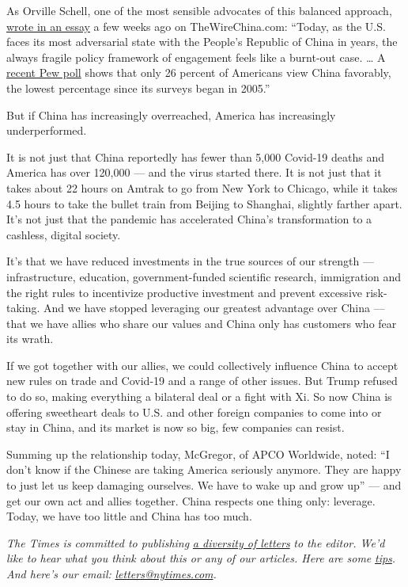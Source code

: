 As Orville Schell, one of the most sensible advocates of this balanced
approach,
\href{https://www.thewirechina.com/2020/06/07/the-birth-life-and-death-of-engagement/}{wrote
in an essay} a few weeks ago on TheWireChina.com: ``Today, as the U.S.
faces its most adversarial state with the People's Republic of China in
years, the always fragile policy framework of engagement feels like a
burnt-out case. \ldots{} A
\href{https://www.pewresearch.org/global/2020/04/21/u-s-views-of-china-increasingly-negative-amid-coronavirus-outbreak/}{recent
Pew poll} shows that only 26 percent of Americans view China favorably,
the lowest percentage since its surveys began in 2005.''

But if China has increasingly overreached, America has increasingly
underperformed.

It is not just that China reportedly has fewer than 5,000 Covid-19
deaths and America has over 120,000 --- and the virus started there. It
is not just that it takes about 22 hours on Amtrak to go from New York
to Chicago, while it takes 4.5 hours to take the bullet train from
Beijing to Shanghai, slightly farther apart. It's not just that the
pandemic has accelerated China's transformation to a cashless, digital
society.

It's that we have reduced investments in the true sources of our
strength --- infrastructure, education, government-funded scientific
research, immigration and the right rules to incentivize productive
investment and prevent excessive risk-taking. And we have stopped
leveraging our greatest advantage over China --- that we have allies who
share our values and China only has customers who fear its wrath.

If we got together with our allies, we could collectively influence
China to accept new rules on trade and Covid-19 and a range of other
issues. But Trump refused to do so, making everything a bilateral deal
or a fight with Xi. So now China is offering sweetheart deals to U.S.
and other foreign companies to come into or stay in China, and its
market is now so big, few companies can resist.

Summing up the relationship today, McGregor, of APCO Worldwide, noted:
``I don't know if the Chinese are taking America seriously anymore. They
are happy to just let us keep damaging ourselves. We have to wake up and
grow up'' --- and get our own act and allies together. China respects
one thing only: leverage. Today, we have too little and China has too
much.

\emph{The Times is committed to publishing}
\href{https://www.nytimes.com/2019/01/31/opinion/letters/letters-to-editor-new-york-times-women.html}{\emph{a
diversity of letters}} \emph{to the editor. We'd like to hear what you
think about this or any of our articles. Here are some}
\href{https://help.nytimes.com/hc/en-us/articles/115014925288-How-to-submit-a-letter-to-the-editor}{\emph{tips}}\emph{.
And here's our email:}
\href{mailto:letters@nytimes.com}{\emph{letters@nytimes.com}}\emph{.}

